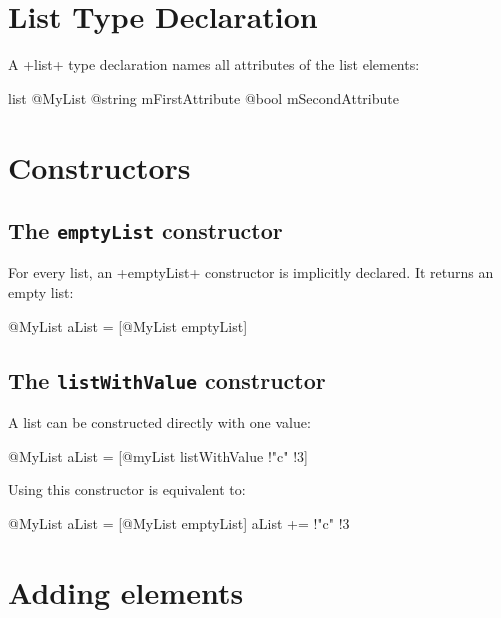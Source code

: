 

\section{List Type Declaration}

A \ggs+list+ type declaration names all attributes of the list elements:

\begin{galgas}
list @MyList {
  @string mFirstAttribute
  @bool mSecondAttribute
}
\end{galgas}

\section{Constructors}

\subsection{The \texttt{emptyList} constructor}

For every list, an \ggs+emptyList+ constructor is implicitly declared. It returns an empty list:

\begin{galgas}
@MyList aList = [@MyList emptyList]
\end{galgas}


\subsection{The \texttt{listWithValue} constructor}

A list can be constructed directly with one value:

\begin{galgas}
@MyList aList = [@myList listWithValue !"c" !3]
\end{galgas}


Using this constructor is equivalent to:

\begin{galgas}
@MyList aList = [@MyList emptyList]
aList += !"c" !3
\end{galgas}

\section{Adding elements}

